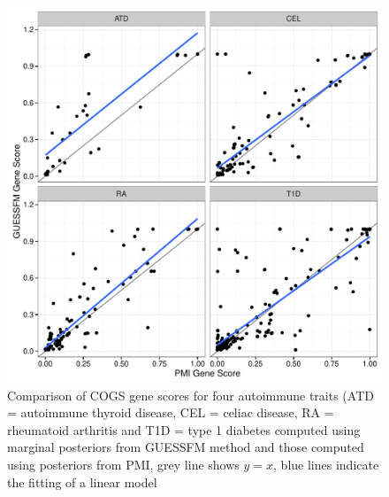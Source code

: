 \documentclass[a4paper,11pt]{report}
\begin{document}
\begin{figure}[h]
\includegraphics[width=\textwidth]{gfm_vs_pmi_gs.pdf}
\caption{Comparison of COGS gene scores for four autoimmune traits (ATD = autoimmune thyroid disease, CEL = celiac disease, RA = rheumatoid arthritis and T1D = type 1 diabetes computed using marginal posteriors from GUESSFM method and those computed using posteriors from PMI, grey line shows $y=x$, blue lines indicate the fitting of a linear model}
\label{fig:gfm_vs_pmi_gs}
\end{figure}
\end{document}
